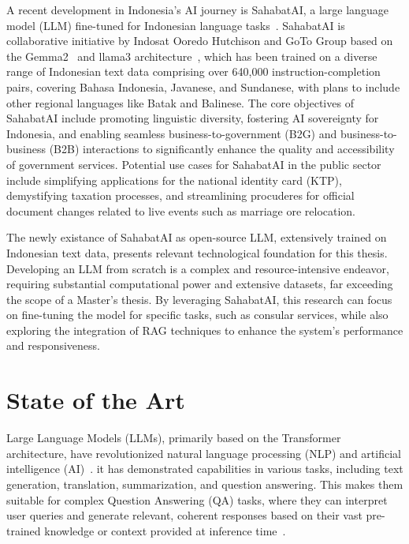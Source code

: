 \documentclass[12pt]{report}
\begin{document}
A recent development in Indonesia's AI journey is SahabatAI, a large language model (LLM) fine-tuned for Indonesian language tasks~\cite{gemma2_sahabat_ai_v1_instruct}. SahabatAI is collaborative initiative by Indosat Ooredo Hutchison and GoTo Group based on the Gemma2~\cite{gemma2_sahabat_ai_v1_instruct} and llama3 architecture~\cite{llama3_sahabat_ai_v1_instruct}, which has been trained on a diverse range of Indonesian text data comprising over 640,000 instruction-completion pairs, covering Bahasa Indonesia, Javanese, and Sundanese, with plans to include other regional languages like Batak and Balinese. The core objectives of SahabatAI include promoting linguistic diversity, fostering AI sovereignty for Indonesia, and enabling seamless business-to-government (B2G) and business-to-business (B2B) interactions to significantly enhance the quality and accessibility of government services. Potential use cases for SahabatAI in the public sector include simplifying applications for the national identity card (KTP), demystifying taxation processes, and streamlining procuderes for official document changes related to live events such as marriage ore relocation.

The newly existance of SahabatAI as open-source LLM, extensively trained on Indonesian text data, presents relevant technological foundation for this thesis. Developing an LLM from scratch is a complex and resource-intensive endeavor, requiring substantial computational power and extensive datasets, far exceeding the scope of a Master's thesis. By leveraging SahabatAI, this research can focus on fine-tuning the model for specific tasks, such as consular services, while also exploring the integration of RAG techniques to enhance the system's performance and responsiveness.

\section{State of the Art}

Large Language Models (LLMs), primarily based on the Transformer architecture, have revolutionized natural language processing (NLP) and artificial intelligence (AI)~\cite{NIPS2017_3f5ee243}. it has demonstrated capabilities in various tasks, including text generation, translation, summarization, and question answering. This makes them suitable for complex Question Answering (QA) tasks, where they can interpret user queries and generate relevant, coherent responses based on their vast pre-trained knowledge or context provided at inference time~\cite{jm3}. 
\end{document}
